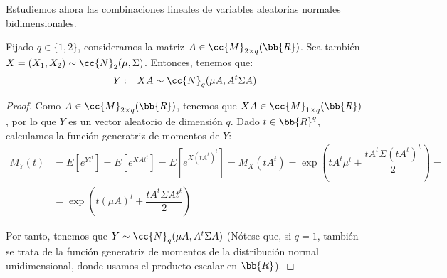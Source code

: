 Estudiemos ahora las combinaciones lineales de variables aleatorias normales bidimensionales.
\begin{prop}
    Fijado $q\in \{1,2\}$, consideramos la matriz $A\in \cc{M}_{2\times q}(\bb{R})$. Sea también $X=(X_1, X_2)\sim \cc{N}_2(\mu, \Sigma)$. Entonces, tenemos que:
    \begin{equation*}
        Y:=XA\sim \cc{N}_q(\mu A, A^t\Sigma A)
    \end{equation*}
\end{prop}
\begin{proof}
    Como $A\in \cc{M}_{2\times q}(\bb{R})$, tenemos que $XA\in \cc{M}_{1\times q}(\bb{R})$, por lo que $Y$ es un vector aleatorio de dimensión $q$. Dado $t\in \bb{R}^q$, calculamos la función generatriz de momentos de $Y$:
    \begin{align*}
        M_Y(t)&=E\left[e^{Yt^t}\right]
        = E\left[e^{XAt^t}\right]
        = E\left[e^{X(tA^t)^t}\right]
        = M_X(tA^t)
        = \exp\left( tA^t \mu^t+\dfrac{tA^t\Sigma (tA^t)^t}{2}\right)
        =\\&= \exp\left(t(\mu A)^t+\dfrac{tA^t\Sigma A t^t}{2}\right)
    \end{align*}

    Por tanto, tenemos que $Y\sim \cc{N}_q(\mu A, A^t\Sigma A)$ (Nótese que, si $q=1$, también se trata de la función generatriz de momentos de la distribución normal unidimensional, donde usamos el producto escalar en $\bb{R}$).
\end{proof}

